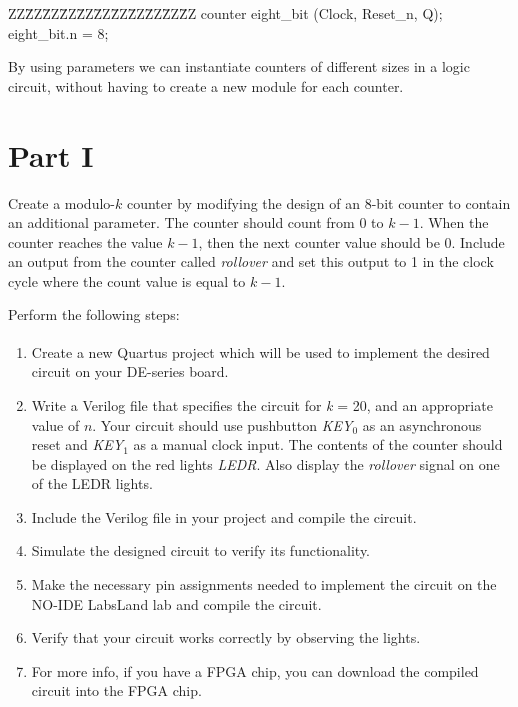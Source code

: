 \documentclass[epsfig,10pt,fullpage]{article}
\begin{document}
\begin{center}
\begin{minipage}[t]{12.5 cm}
\begin{tabbing}
ZZ\=ZZ\=ZZ\=ZZ\=ZZ\=ZZ\=ZZ\=ZZ\=ZZ\=ZZ\=ZZ\kill
counter eight\_bit (Clock, Reset\_n, Q);\\
 eight\_bit.n = 8;
\end{tabbing}
\end{minipage}
\end{center}

By using parameters we can instantiate counters of different sizes in a logic circuit, without 
having to create a new module for each counter.

\section*{Part I}
Create a modulo-$k$ counter by modifying the design of an 8-bit counter to contain an 
additional parameter. The counter should count from $0$ to $k-1$. When the counter reaches 
the value $k-1$, then the next counter value should be $0$. Include an output from the
counter called {\it rollover} and set this output to 1 in the clock cycle where the count value
is equal to $k-1$.

Perform the following steps:
\begin{enumerate}
\item Create a new Quartus\textsuperscript{\textregistered} project which will be used to implement the desired circuit
on your DE-series board.
\item Write a Verilog file that specifies the circuit for {\it k} = 20, and an appropriate
value of $n$.  Your circuit should use pushbutton {\it KEY}$_0$ as an asynchronous reset 
and {\it KEY}$_1$ as a manual clock input. 
The contents of the counter should be displayed on the red lights {\it LEDR}. Also display 
the {\it rollover} signal on one of the LEDR lights.
\item Include the Verilog file in your project and compile the circuit.
\item Simulate the designed circuit to verify its functionality.
\item Make the necessary pin assignments needed to implement the circuit on the NO-IDE LabsLand lab and compile the circuit.
\item Verify that your circuit works correctly by observing the lights.
\item For more info, if you have a FPGA chip, you can download the compiled circuit into the FPGA chip.
\end{enumerate}
\end{document}

